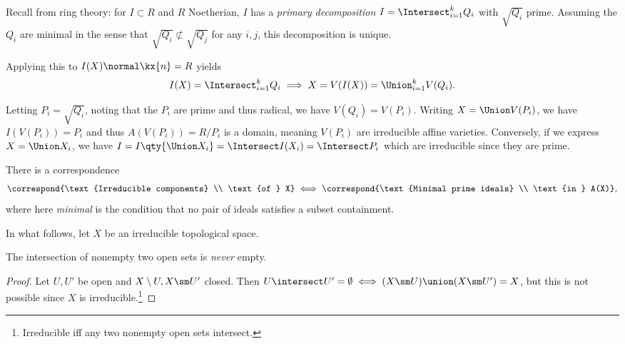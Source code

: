 Recall from ring theory: for \(I\subset R\) and \(R\) Noetherian, \(I\)
has a \emph{primary decomposition} \(I = \Intersect_{i=1}^k Q_i\) with
\(\sqrt{Q_i}\) prime. Assuming the \(Q_i\) are minimal in the sense that
\(\sqrt{Q_i} \not\subset \sqrt{Q_j}\) for any \(i, j\), this
decomposition is unique.

Applying this to \(I(X) \normal \kx{n} = R\) yields
\begin{align*}  
I(X) = \Intersect_{i=1}^k Q_i 
\implies
X  = V(I(X)) = \Union_{i=1}^k V(Q_i)
.\end{align*}

Letting \(P_i = \sqrt{Q_i}\), noting that the \(P_i\) are prime and thus
radical, we have \(V(Q_i) = V(P_i)\). Writing \(X = \Union V(P_i)\), we
have \(I(V(P_i)) = P_i\) and thus \(A(V(P_i)) = R/P_i\) is a domain,
meaning \(V(P_i)\) are irreducible affine varieties. Conversely, if we
express \(X = \Union X_i\), we have
\(I = I\qty{\Union X_i} = \Intersect I(X_i) = \Intersect P_i\) which are
irreducible since they are prime.

\begin{remark}

There is a correspondence
\begin{align*}  
\correspond{\text{Irreducible components} \\ \text{of } X} 
\iff
\correspond{\text{Minimal prime ideals} \\ \text{in } A(X)}
,\end{align*} where here \emph{minimal} is the condition that no pair of
ideals satisfies a subset containment.

\end{remark}

In what follows, let \(X\) be an irreducible topological space.

\begin{proposition}[1]

The intersection of nonempty two open sets is \emph{never} empty.

\end{proposition}

\begin{proof}

Let \(U, U'\) be open and \(X\setminus U, X\sm U'\) closed. Then
\(U\intersect U' = \emptyset \iff (X\sm U) \union (X\sm U') = X\), but
this is not possible since \(X\) is irreducible.\footnote{Irreducible
  iff any two nonempty open sets intersect.}

\end{proof}


